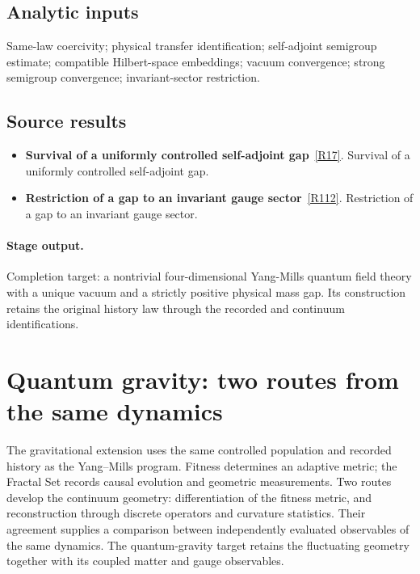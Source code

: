 \documentclass[11pt,a4paper]{article}
\begin{document}
\subsection*{Analytic inputs}
Same-law coercivity; physical transfer identification; self-adjoint semigroup estimate; compatible Hilbert-space embeddings; vacuum convergence; strong semigroup convergence; invariant-sector restriction.
\subsection*{Source results}
\begin{itemize}
\item \textbf{Survival of a uniformly controlled self-adjoint gap}~\hyperref[src:thm-mass-gap-rg-fixed-point]{[R17]}. Survival of a uniformly controlled self-adjoint gap.
\item \textbf{Restriction of a gap to an invariant gauge sector}~\hyperref[src:thm-gauge-sector-mass-gap]{[R112]}. Restriction of a gap to an invariant gauge sector.
\end{itemize}
\paragraph{Stage output.} Completion target: a nontrivial four-dimensional Yang-Mills quantum field theory with a unique vacuum and a strictly positive physical mass gap. Its construction retains the original history law through the recorded and continuum identifications.

\clearpage
\section{Quantum gravity: two routes from the same dynamics}
\label{sec:quantum-gravity}

The gravitational extension uses the same controlled population and recorded
history as the Yang--Mills program. Fitness determines an adaptive metric;
the Fractal Set records causal evolution and geometric measurements. Two
routes develop the continuum geometry: differentiation of the fitness metric,
and reconstruction through discrete operators and curvature statistics.
Their agreement supplies a comparison between independently evaluated
observables of the same dynamics. The quantum-gravity target retains the
fluctuating geometry together with its coupled matter and gauge observables.
\end{document}
